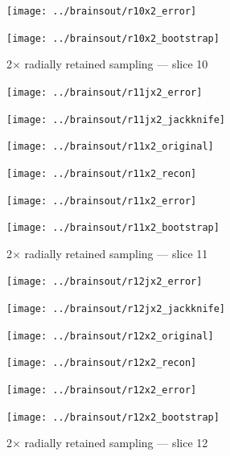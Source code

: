 \documentclass[article]{jdssv}
\begin{document}
\begin{appendix}
\begin{figure}
\begin{centering}
\parbox{\imsize}{\texttt{[image: ../brainsout/r10x2\_error]}}
\parbox{\imsize}{\texttt{[image: ../brainsout/r10x2\_bootstrap]}}

\end{centering}
\caption{2$\times$ radially retained sampling --- slice 10}
\end{figure}


\begin{figure}
\begin{centering}

\parbox{\imsize}{\texttt{[image: ../brainsout/r11jx2\_error]}}
\parbox{\imsize}{\texttt{[image: ../brainsout/r11jx2\_jackknife]}}

\vspace{\vertsep}

\parbox{\imsize}{\texttt{[image: ../brainsout/r11x2\_original]}}
\parbox{\imsize}{\texttt{[image: ../brainsout/r11x2\_recon]}}

\vspace{\vertsep}

\parbox{\imsize}{\texttt{[image: ../brainsout/r11x2\_error]}}
\parbox{\imsize}{\texttt{[image: ../brainsout/r11x2\_bootstrap]}}

\end{centering}
\caption{2$\times$ radially retained sampling --- slice 11}
\end{figure}


\begin{figure}
\begin{centering}

\parbox{\imsize}{\texttt{[image: ../brainsout/r12jx2\_error]}}
\parbox{\imsize}{\texttt{[image: ../brainsout/r12jx2\_jackknife]}}

\vspace{\vertsep}

\parbox{\imsize}{\texttt{[image: ../brainsout/r12x2\_original]}}
\parbox{\imsize}{\texttt{[image: ../brainsout/r12x2\_recon]}}

\vspace{\vertsep}

\parbox{\imsize}{\texttt{[image: ../brainsout/r12x2\_error]}}
\parbox{\imsize}{\texttt{[image: ../brainsout/r12x2\_bootstrap]}}

\end{centering}
\caption{2$\times$ radially retained sampling --- slice 12}
\end{figure}


\begin{figure}
\begin{centering}


\end{centering}
\end{figure}
\end{appendix}
\end{document}

